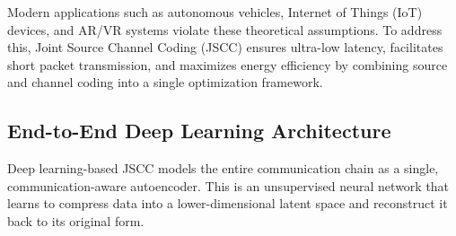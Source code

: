 \documentclass[10pt, conference]{IEEEtran}
\begin{document}
Modern applications such as autonomous vehicles, Internet of Things (IoT) devices, and AR/VR systems violate these theoretical assumptions. To address this, Joint Source Channel Coding (JSCC) ensures ultra-low latency, facilitates short packet transmission, and maximizes energy efficiency by combining source and channel coding into a single optimization framework.

\subsection{\textbf{End-to-End Deep Learning Architecture}}
Deep learning-based JSCC models the entire communication chain as a single, communication-aware autoencoder. This is an unsupervised neural network that learns to compress data into a lower-dimensional latent space and reconstruct it back to its original form.
\end{document}

